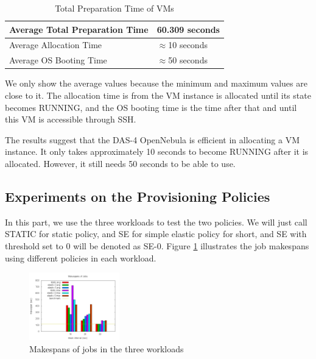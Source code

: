 \begin{table}
\caption{Total Preparation Time of VMs}
\label{table_vm_preparation}
\centering
\begin{tabular}{|l|l|}
\hline
Average Total Preparation Time & 60.309 seconds \\
\hline
Average Allocation Time & $\approx$10 seconds \\
\hline
Average OS Booting Time & $\approx$50 seconds \\
\hline
\end{tabular}
\end{table}

We only show the average values because the minimum and maximum values are close to it. The allocation time is from the VM instance is allocated until its state becomes RUNNING, and the OS booting time is the time after that and until this VM is accessible through SSH.

The results suggest that the DAS-4 OpenNebula is efficient in allocating a VM instance. It only takes approximately 10 seconds to become RUNNING after it is allocated. However, it still needs 50 seconds to be able to use.


\subsection{Experiments on the Provisioning Policies}
In this part, we use the three workloads to test the two policies. We will just call STATIC for static policy, and SE for simple elastic policy for short, and SE with threshold set to 0 will be denoted as SE-0. Figure \ref{figure_jobmakespan} illustrates the job makespans using different policies in each workload.

\begin{figure}[!t]
\centering
\includegraphics[width=0.35\textwidth]{pictures/all-makespans.png}
\caption{Makespans of jobs in the three workloads}
\label{figure_jobmakespan}
\end{figure}


